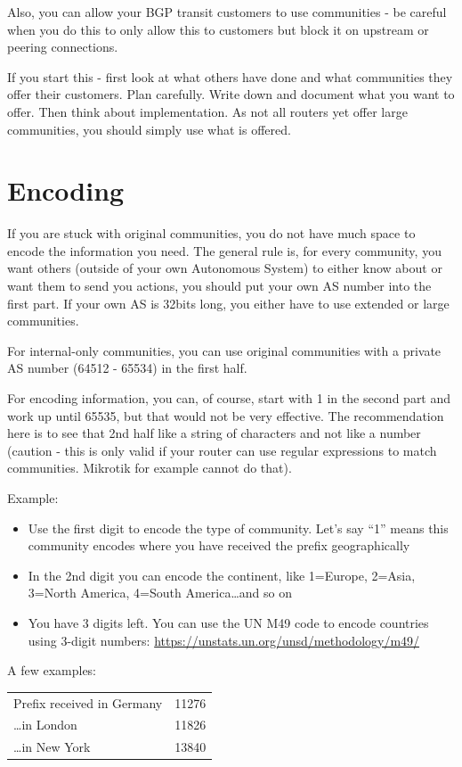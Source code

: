 Also, you can allow your BGP transit customers to use communities - be careful when you do this to only allow this to customers but block it on upstream or peering connections.

If you start this - first look at what others have done and what communities they offer their customers. Plan carefully. Write down and document what you want to offer. Then think about implementation. As not all routers yet offer large communities, you should simply use what is offered.

\section{Encoding}
If you are stuck with original communities, you do not have much space to encode the information you need. The general rule is, for every community, you want others (outside of your own Autonomous System) to either know about or want them to send you actions, you should put your own AS number into the first part. If your own AS is 32bits long, you either have to use extended or large communities.

For internal-only communities, you can use original communities with a private AS number (64512 - 65534) in the first half.

For encoding information, you can, of course, start with 1 in the second part and work up until 65535, but that would not be very effective.
The recommendation here is to see that 2nd half like a string of characters and not like a number (caution - this is only valid if your router can use regular expressions to match communities. Mikrotik for example cannot do that).

Example:
\begin{itemize}
  \item Use the first digit to encode the type of community. Let's say ``1'' means this community encodes where you have received the prefix geographically
  \item In the 2nd digit you can encode the continent, like 1=Europe, 2=Asia, 3=North America, 4=South America\ldots and so on
  \item You have 3 digits left. You can use the UN M49 code to encode countries using 3-digit numbers: \url{https://unstats.un.org/unsd/methodology/m49/}
\end{itemize}

A few examples:\\
\begin{tabular}{ll}
  Prefix received in Germany & 11276 \\
  \ldots in London & 11826 \\
  \ldots in New York & 13840 \\
\end{tabular}

